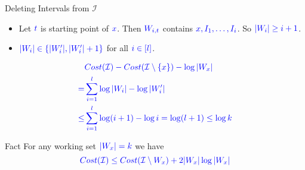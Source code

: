 \documentclass[10pt, handout]{beamer}
\begin{document}
\begin{frame}{Deleting Intervals from $\mathcal{I}$}
	\begin{itemize}
		\item Let $\mathcolor{blue}{t}$ is starting point of $\mathcolor{blue}{x}$. Then $\mathcolor{blue}{W_{i,t}}$ contains $\mathcolor{blue}{x, I_1,\dots, I_i}$. So $\mathcolor{blue}{|W_i|\geq i+1}$.
		\item $\mathcolor{blue}{|W_i|\in\{|W_i'|,|W_i'|+1\}}$ for all $\mathcolor{blue}{i\in[l]}$.
	\end{itemize}
	\begin{align*}
		                       & \mathcolor{blue}{Cost(\mathcal{I})-Cost(\mathcal{I}\setminus \{x\})-\log |W_x|} \\
		\mathcolor{blue}{=}    & \mathcolor{blue}{\sum\limits_{i=1}^l \log|W_i|-\log|W_i'|}                      \\
		\mathcolor{blue}{\leq} & \mathcolor{blue}{\sum\limits_{i=1}^l \log(i+1)-\log i =\log (l+1) \leq \log k}
	\end{align*}

	\begin{alertblock}{Fact}
		For any working set $\mathcolor{blue}{|W_x|=k}$ we have $$\mathcolor{blue}{Cost(\mathcal{I})\leq Cost(\mathcal{I}\setminus W_x)+2|W_x|\log |W_x|}$$
	\end{alertblock}
\end{frame}
\end{document}
